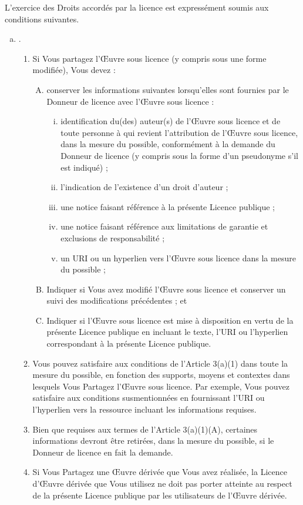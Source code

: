 L’exercice des Droits accordés par la licence est expressément soumis aux conditions suivantes.

\begin{enumerate}[a.]
\item {}.
\begin{enumerate}[1.]
\item Si Vous partagez l’Œuvre sous licence (y compris sous une forme modifiée), Vous devez :
\begin{enumerate}[A.]
\item conserver les informations suivantes lorsqu’elles sont fournies par le Donneur de licence avec l’Œuvre sous licence : 
\begin{enumerate}[i.]
\item identification du(des) auteur(s) de l’Œuvre sous licence et de toute personne à qui revient l’attribution de l’Œuvre sous licence, dans la mesure du possible, conformément à la demande du Donneur de licence (y compris sous la forme d’un pseudonyme s’il est indiqué) ;
\item l'indication de l’existence d’un droit d’auteur ;
\item une notice faisant référence à la présente Licence publique ;
\item une notice faisant référence aux limitations de garantie et exclusions de responsabilité ;
\item un URI ou un hyperlien vers l’Œuvre sous licence dans la mesure du possible ;
\end{enumerate}
\item Indiquer si Vous avez modifié l’Œuvre sous licence et conserver un suivi des modifications précédentes ; et
\item Indiquer si l’Œuvre sous licence est mise à disposition en vertu de la présente Licence publique en incluant le texte, l’URI ou l’hyperlien correspondant à la présente Licence publique.
\end{enumerate}
\item Vous pouvez satisfaire aux conditions de l’Article 3(a)(1) dans toute la mesure du possible, en fonction des supports, moyens et contextes dans lesquels Vous Partagez l’Œuvre sous licence. Par exemple, Vous pouvez satisfaire aux conditions susmentionnées en fournissant l’URI ou l’hyperlien vers la ressource incluant les informations requises.
\item Bien que requises aux termes de l’Article 3(a)(1)(A), certaines informations devront être retirées, dans la mesure du possible, si le Donneur de licence en fait la demande.
\item Si Vous Partagez une Œuvre dérivée que Vous avez réalisée, la Licence d’Œuvre dérivée que Vous utilisez ne doit pas porter atteinte au respect de la présente Licence publique par les utilisateurs de l’Œuvre dérivée.
\end{enumerate}
\end{enumerate}

